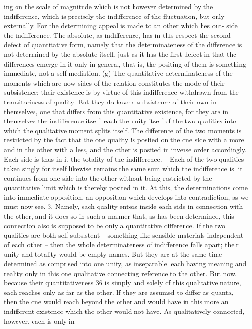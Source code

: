 ing on the scale of magnitude which is not however determined by the
indifference, which is precisely the indifference of the fluctuation, but only
externally. For the determining appeal is made to an other which lies out-
side the indifference. The absolute, as indifference, has in this respect the
second defect of quantitative form, namely that the determinateness of
the difference is not determined by the absolute itself, just as it has the
first defect in that the differences emerge in it only in general, that is, the
positing of them is something immediate, not a self-mediation.
(g) The quantitative determinateness of the moments which are now
sides of the relation constitutes the mode of their subsistence; their existence is
by virtue of this indifference withdrawn from the transitoriness of quality.
But they do have a subsistence of their own in themselves, one that differs
from this quantitative existence, for they are in themselves the indifference
itself, each the unity itself of the two qualities into which the qualitative
moment splits itself. The difference of the two moments is restricted by
the fact that the one quality is posited on the one side with a more and in
the other with a less, and the other is posited in inverse order accordingly.
Each side is thus in it the totality of the indifference. – Each of the two
qualities taken singly for itself likewise remains the same sum which the
indifference is; it continues from one side into the other without being
restricted by the quantitative limit which is thereby posited in it. At this,
the determinations come into immediate opposition, an opposition which
develops into contradiction, as we must now see.
3. Namely, each quality enters inside each side in connection with the
other, and it does so in such a manner that, as has been determined, this
connection also is supposed to be only a quantitative difference. If the
two qualities are both self-subsistent – something like sensible materials
independent of each other – then the whole determinateness of indifference
falls apart; their unity and totality would be empty names. But they are
at the same time determined as comprised into one unity, as inseparable,
each having meaning and reality only in this one qualitative connecting
reference to the other. But now, because their quantitativeness 36 is simply
and solely of this qualitative nature, each reaches only as far as the other. If
they are assumed to differ as quanta, then the one would reach beyond
the other and would have in this more an indifferent existence which the
other would not have. As qualitatively connected, however, each is only in
